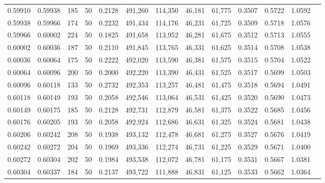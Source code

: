 \begin{tabular}{rrrrrrrrrrrrr}
0.59910 & 0.59938 &   185 &  50 &                                     0.2128 & 491,260 & 114,350 &  46,181 &  61,775 & 0.3507 & 0.5722 & 1.0592 \\
0.59938 & 0.59966 &   174 &  50 &                                     0.2232 & 491,434 & 114,176 &  46,231 &  61,725 & 0.3509 & 0.5718 & 1.0576 \\
0.59966 & 0.60002 &   224 &  50 &                                     0.1825 & 491,658 & 113,952 &  46,281 &  61,675 & 0.3512 & 0.5713 & 1.0555 \\
0.60002 & 0.60036 &   187 &  50 &                                     0.2110 & 491,845 & 113,765 &  46,331 &  61,625 & 0.3514 & 0.5708 & 1.0538 \\
0.60036 & 0.60064 &   175 &  50 &                                     0.2222 & 492,020 & 113,590 &  46,381 &  61,575 & 0.3515 & 0.5704 & 1.0522 \\
0.60064 & 0.60096 &   200 &  50 &                                     0.2000 & 492,220 & 113,390 &  46,431 &  61,525 & 0.3517 & 0.5699 & 1.0503 \\
0.60096 & 0.60118 &   133 &  50 &                                     0.2732 & 492,353 & 113,257 &  46,481 &  61,475 & 0.3518 & 0.5694 & 1.0491 \\
0.60118 & 0.60149 &   193 &  50 &                                     0.2058 & 492,546 & 113,064 &  46,531 &  61,425 & 0.3520 & 0.5690 & 1.0473 \\
0.60149 & 0.60175 &   185 &  50 &                                     0.2128 & 492,731 & 112,879 &  46,581 &  61,375 & 0.3522 & 0.5685 & 1.0456 \\
0.60176 & 0.60205 &   193 &  50 &                                     0.2058 & 492,924 & 112,686 &  46,631 &  61,325 & 0.3524 & 0.5681 & 1.0438 \\
0.60206 & 0.60242 &   208 &  50 &                                     0.1938 & 493,132 & 112,478 &  46,681 &  61,275 & 0.3527 & 0.5676 & 1.0419 \\
0.60242 & 0.60272 &   204 &  50 &                                     0.1969 & 493,336 & 112,274 &  46,731 &  61,225 & 0.3529 & 0.5671 & 1.0400 \\
0.60272 & 0.60304 &   202 &  50 &                                     0.1984 & 493,538 & 112,072 &  46,781 &  61,175 & 0.3531 & 0.5667 & 1.0381 \\
0.60304 & 0.60337 &   184 &  50 &                                     0.2137 & 493,722 & 111,888 &  46,831 &  61,125 & 0.3533 & 0.5662 & 1.0364 \\

\end{tabular}
